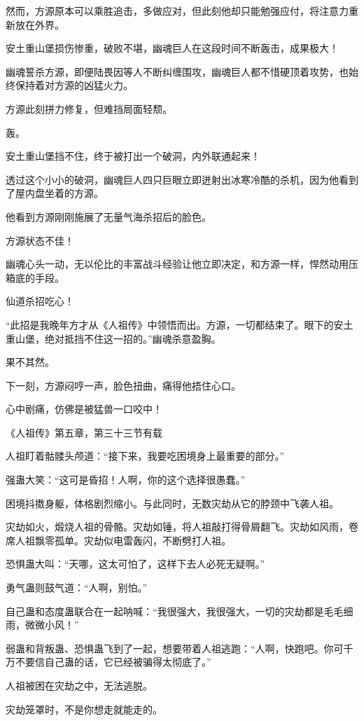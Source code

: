 \begin{this_body}
然而，方源原本可以乘胜追击，多做应对，但此刻他却只能勉强应付，将注意力重新放在外界。

安土重山堡损伤惨重，破败不堪，幽魂巨人在这段时间不断轰击，成果极大！

幽魂誓杀方源，即便陆畏因等人不断纠缠围攻，幽魂巨人都不惜硬顶着攻势，也始终保持着对方源的凶猛火力。

方源此刻拼力修复，但难挡局面轻颓。

轰。

安土重山堡挡不住，终于被打出一个破洞，内外联通起来！

透过这个小小的破洞，幽魂巨人四只巨眼立即迸射出冰寒冷酷的杀机，因为他看到了屋内盘坐着的方源。

他看到方源刚刚施展了无量气海杀招后的脸色。

方源状态不佳！

幽魂心头一动，无以伦比的丰富战斗经验让他立即决定，和方源一样，悍然动用压箱底的手段。

仙道杀招吃心！

“此招是我晚年方才从《人祖传》中领悟而出。方源，一切都结束了。眼下的安土重山堡，绝对抵挡不住这一招的。”幽魂杀意盈胸。

果不其然。

下一刻，方源闷哼一声，脸色扭曲，痛得他捂住心口。

心中剧痛，仿佛是被猛兽一口咬中！

《人祖传》第五章，第三十三节有载

人祖盯着骷髅头颅道：“接下来，我要吃困境身上最重要的部分。”

强蛊大笑：“这可是昏招！人啊，你的这个选择很愚蠢。”

困境抖擞身躯，体格剧烈缩小。与此同时，无数灾劫从它的脖颈中飞袭人祖。

灾劫如火，煅烧人祖的骨骼。灾劫如锤，将人祖敲打得骨屑翻飞。灾劫如风雨，卷席人祖飘零孤单。灾劫似电雷轰闪，不断劈打人祖。

恐惧蛊大叫：“天哪，这太可怕了，这样下去人必死无疑啊。”

勇气蛊则鼓气道：“人啊，别怕。”

自己蛊和态度蛊联合在一起呐喊：“我很强大，我很强大，一切的灾劫都是毛毛细雨，微微小风！”

弱蛊和背叛蛊、恐惧蛊飞到了一起，想要带着人祖逃跑：“人啊，快跑吧。你可千万不要信自己蛊的话，它已经被骗得太彻底了。”

人祖被困在灾劫之中，无法逃脱。

灾劫笼罩时，不是你想走就能走的。


\end{this_body}
